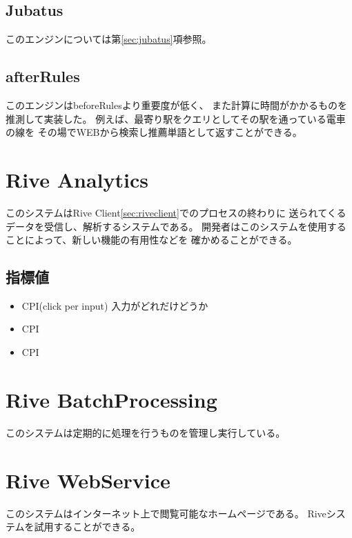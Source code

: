 \subsection{Jubatus}
このエンジンについては第\ref{sec:jubatus}項参照。

\subsection{afterRules}
このエンジンはbeforeRulesより重要度が低く、
また計算に時間がかかるものを推測して実装した。
例えば、最寄り駅をクエリとしてその駅を通っている電車の線を
その場でWEBから検索し推薦単語として返すことができる。

\section{Rive Analytics}
このシステムはRive Client\ref{sec:riveclient}でのプロセスの終わりに
送られてくるデータを受信し、解析するシステムである。
開発者はこのシステムを使用することによって、新しい機能の有用性などを
確かめることができる。

\subsection{指標値}
\begin{itemize}
  \item CPI(click per input)
    入力がどれだけどうか
  \item CPI
  \item CPI
\end{itemize}

\section{Rive BatchProcessing}
このシステムは定期的に処理を行うものを管理し実行している。

\section{Rive WebService}
このシステムはインターネット上で閲覧可能なホームページである。
Riveシステムを試用することができる。

